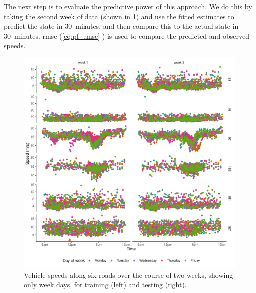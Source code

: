 The next step is to evaluate the predictive power of this approach. We do this by taking the second week of data (shown in \cref{fig:tt_week1_load}) and use the fitted estimates to predict the state in 30~minutes, and then compare this to the actual state in 30~minutes. \Gls{rmse} (\cref{eq:pf_rmse} ) is used to compare the predicted and observed speeds.



\begin{knitrout}\small
{}\color{fgcolor}\begin{figure}

{\centering \includegraphics[width=\linewidth]{figure/tt_week1_load-1} 

}

\caption[Vehicle speeds along six roads over of two weeks.]{Vehicle speeds along six roads over the course of two weeks, showing only week days, for training (left) and testing (right).}\label{fig:tt_week1_load}
\end{figure}


\end{knitrout}

